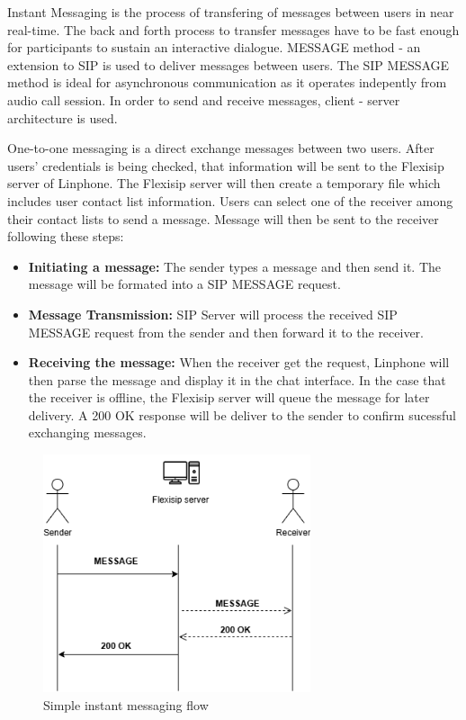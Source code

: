     Instant Messaging is the process of transfering of messages between users in near real-time.
    The back and forth process to transfer messages have to be fast enough for participants to sustain an interactive dialogue.
    MESSAGE method - an extension to SIP is used to deliver messages between users. 
    The SIP MESSAGE method is ideal for asynchronous communication as it operates indepently from audio call session.
    In order to send and receive messages, client - server architecture is used.  

    \noindent One-to-one messaging is a direct exchange messages between two users. 
    After users' credentials is being checked, that information will be sent to the Flexisip server of Linphone. The Flexisip server will then create a temporary file which includes user contact list information.  
    Users can select one of the receiver among their contact lists to send a message. Message will then be sent to the receiver following these steps:

    \begin{itemize}
        \item \textbf {Initiating a message:} The sender types a message and then send it. The message will be formated into a SIP MESSAGE request. 
        \item \textbf {Message Transmission:} SIP Server will process the received SIP MESSAGE request from the sender and then forward it to the receiver. 
        \item \textbf {Receiving the message:} When the receiver get the request, Linphone will then parse the message and display it in the chat interface.
        In the case that the receiver is offline, the Flexisip server will queue the message for later delivery. A 200 OK response will be deliver to the sender to confirm sucessful exchanging messages.
    \end{itemize}

    \begin{figure}[H]
        \centering
        \includegraphics[width=0.7\textwidth, height=0.4\textheight]{image/Instant messaging.png} 
        \caption{Simple instant messaging flow}
        \label{fig:instant_messaging}
    \end{figure}


    